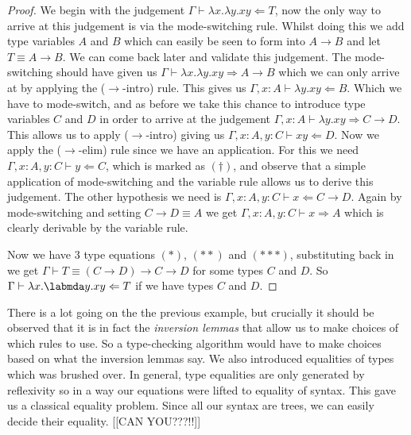 \begin{example}
        \begin{proof}
        We begin with the judgement $\Gamma \vdash \lambda x . \lambda y . x y \Leftarrow T$, now the only way to arrive at this judgement is via the mode-switching rule. Whilst doing this we add type variables $A$ and $B$ which can easily be seen to form into $A \to B$ and let $T \equiv A \to B$. We can come back later and validate this judgement. The mode-switching should have given us $\Gamma \vdash \lambda x . \lambda y . x y \Rightarrow A \to B$ which we can only arrive at by applying the ($\to$-intro) rule. This gives us $\Gamma , x : A \vdash \lambda y . xy \Leftarrow B$. Which we have to mode-switch, and as before we take this chance to introduce type variables $C$ and $D$ in order to arrive at the judgement $\Gamma , x : A \vdash \lambda y . x y \Rightarrow C \to D$. This allows us to apply ($\to$-intro) giving us $\Gamma , x : A , y : C \vdash xy \Leftarrow D$. Now we apply the ($\to$-elim) rule since we have an application. For this we need $\Gamma , x : A, y : C \vdash y \Leftarrow C$, which is marked as $(\dagger)$, and observe that a simple application of mode-switching and the variable rule allows us to derive this judgement. The other hypothesis we need is $\Gamma , x : A, y : C \vdash x \Leftarrow C \to D$. Again by mode-switching and setting $C \to D \equiv A$ we get $\Gamma , x : A, y : C \vdash x \Rightarrow A$ which is clearly derivable by the variable rule.
        
        Now we have 3 type equations $(*)$, $(**)$ and $(***)$, substituting back in we get $\Gamma \vdash T \equiv (C \to D) \to C \to D$ for some types $C$ and $D$. So $\Gamma \vdash \lambda x . \labmda y . x y \Leftarrow T$ if we have types $C$ and $D$.
        \end{proof}
\end{example}

\begin{remark}
    There is a lot going on the the previous example, but crucially it should be observed that it is in fact the \emph{inversion lemmas} that allow us to make choices of which rules to use. So a type-checking algorithm would have to make choices based on what the inversion lemmas say. We also introduced equalities of types which was brushed over. In general, type equalities are only generated by reflexivity so in a way our equations were lifted to equality of syntax. This gave us a classical equality problem. Since all our syntax are trees, we can easily decide their equality. [[CAN YOU???!!]]
\end{remark}

